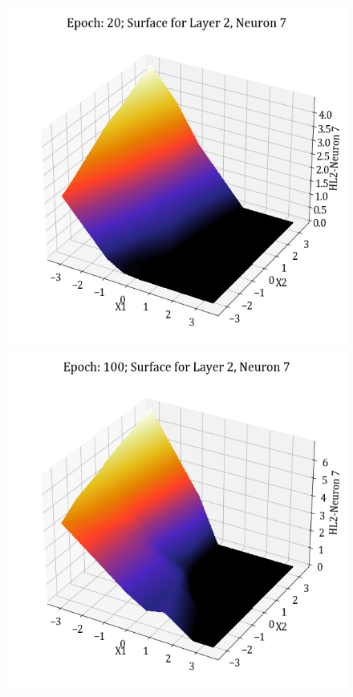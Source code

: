 \documentclass[11pt,a4paper]{article}
\begin{document}
\begin{figure}[H]
    \includegraphics[scale=0.4]{images/1B_MLFFNN_E20_HL2_N7.png}
    \includegraphics[scale=0.4]{images/1B_MLFFNN_E100_HL2_N7.png}

\end{figure}
\end{document}
